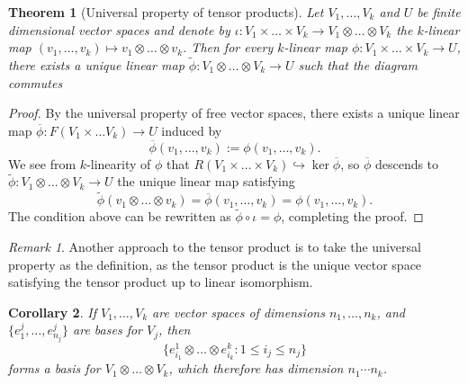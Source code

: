 \documentclass[reqno]{amsart}
\newtheorem{theorem}{Theorem}
\newtheorem{corollary}[theorem]{Corollary}
\theoremstyle{definition}
\theoremstyle{remark}
\newtheorem*{remark}{Remark}
\begin{document}
\begin{theorem}[Universal property of tensor products]
	Let $V_1, \dots, V_k$ and $U$ be finite dimensional vector spaces and denote by $\iota : V_1 \times \dots \times V_k \to V_1 \otimes \dots \otimes V_k$ the $k$-linear map $(v_1, \dots, v_k) \mapsto v_1 \otimes \dots \otimes v_k$. Then for every $k$-linear map $\phi : V_1 \times \dots \times V_k \to U$, there exists a unique linear map $\widetilde \phi :  V_1 \otimes \dots \otimes V_k  \to U$ such that the diagram commutes
	\begin{center}
	\end{center}
\end{theorem}

\begin{proof}
	By the universal property of free vector spaces, there exists a unique linear map $\overline \phi : F(V_1 \times \dots V_k) \to U$ induced by 
		\[ \overline \phi (v_1, \dots, v_k) := \phi(v_1, \dots, v_k).  \]
	We see from $k$-linearity of $\phi$ that $R(V_1 \times \dots \times V_k) \hookrightarrow \ker \overline \phi$, so $\overline \phi$ descends to $\widetilde \phi : V_1 \otimes \dots \otimes V_k \to U$ the unique linear map satisfying 
		\[ \widetilde \phi (v_1 \otimes \dots \otimes v_k) = \overline \phi (v_1, \dots, v_k) = \phi(v_1, \dots, v_k). \]
	The condition above can be rewritten as $\widetilde \phi \circ \iota = \phi$, completing the proof. 
\end{proof}

\begin{remark}
	Another approach to the tensor product is to take the universal property as the definition, as the tensor product is the unique vector space satisfying the tensor product up to linear isomorphism. 
\end{remark}

\begin{corollary}
	If $V_1, \dots, V_k$ are vector spaces of dimensions $n_1, \dots, n_k$, and $\{ e_1^j, \dots, e_{n_j}^j \}$ are bases for $V_j$, then
		 \[ \{ e^1_{i_1} \otimes \dots \otimes e^k_{i_k} : 1 \leq i_j \leq n_j \} \]
	forms a basis for $V_1 \otimes \dots \otimes V_k$, which therefore has dimension $n_1 \cdots n_k$.
\end{corollary}
\end{document}
